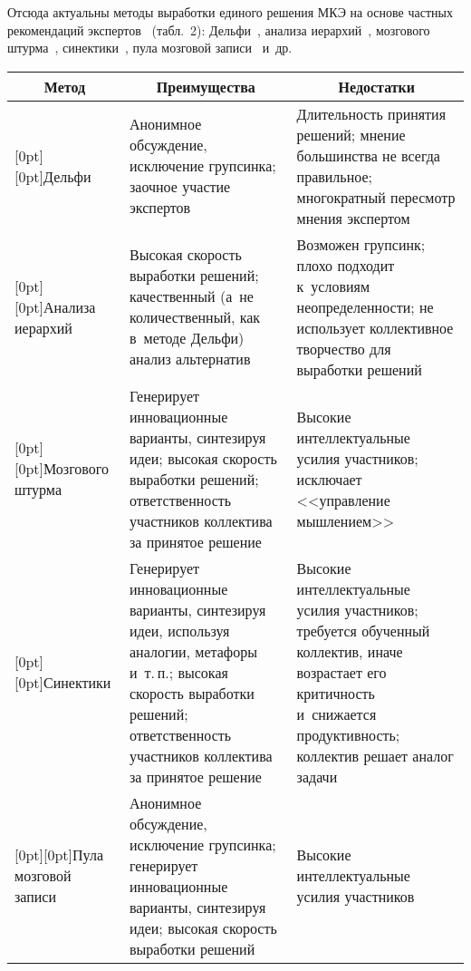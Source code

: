 \begin{multicols}{2}
  Отсюда актуальны методы выработки единого решения МКЭ на основе 
частных рекомендаций экспертов~\cite{9-kir} (табл.~2): Дельфи~\cite{10-kir, 
11-kir}, анализа иерархий~\cite{12-kir, 13-kir}, мозгового штурма~\cite{11-kir}, 
синектики~\cite{10-kir}, пула мозговой записи~\cite{11-kir} и~др.

\end{multicols}

\begin{table*}\small
\begin{center}
\vspace*{2ex}

\begin{tabular}{|l|p{65mm}|p{55mm}|}
\hline
\multicolumn{1}{|c|}{Метод}&\multicolumn{1}{c|}{Преимущества}&\multicolumn{1}{c|}{Недостатки}\\
\hline
\multicolumn{1}{|l|}{\raisebox{-16pt}[0pt][0pt]{Дельфи}}&Анонимное обсуждение, исключение груп\-син\-ка; заочное участие 
экспертов&Длительность принятия решений; мнение большинства не всегда правильное; 
многократный пересмотр мнения экспертом \\
\hline
\multicolumn{1}{|l|}{\raisebox{-16pt}[0pt][0pt]{Анализа 
иерархий}}&Высокая скорость выработки решений; качественный (а~не количественный, как в~методе Дельфи) анализ альтернатив&Возможен групсинк; плохо подходит к~условиям 
неопределенности; не использует коллективное творчество для выработки решений\\
\hline
\multicolumn{1}{|l|}{\raisebox{-16pt}[0pt][0pt]{Мозгового штурма}}&Генерирует инновационные варианты, синтезируя идеи; высокая 
скорость выработки решений; ответственность участников коллектива за принятое 
решение&Высокие интеллектуальные усилия участников; исключает <<управление 
мышлением>> \\
\hline
\multicolumn{1}{|l|}{\raisebox{-22pt}[0pt][0pt]{Синектики}}&Генерирует инновационные варианты, синтезируя идеи, используя 
аналогии, метафоры и~т.\,п.; высокая скорость выработки решений; ответственность 
участников коллектива за принятое решение&Высокие интеллектуальные усилия 
участников; требуется обученный коллектив, иначе возрастает его критичность и~снижается 
продуктивность; коллектив решает аналог задачи \\
\hline
\multicolumn{1}{|l|}{\raisebox{-16pt}[0pt][0pt]{Пула мозговой записи}}&Анонимное обсуждение, исключение групсинка; генерирует 
инновационные варианты, синтезируя идеи; высокая скорость выработки решений&Высокие 
интеллектуальные усилия участников\\
\hline
\end{tabular}
\end{center}
\vspace*{6pt}
\end{table*} 
